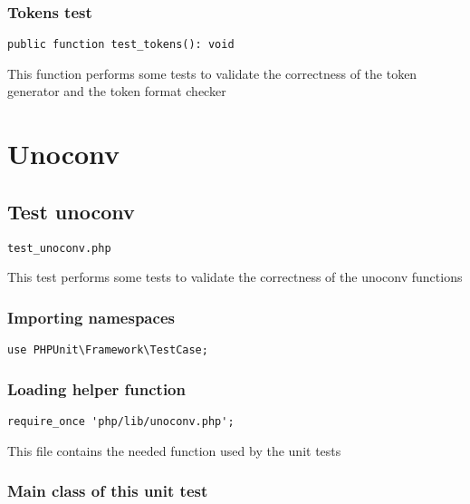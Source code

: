 \documentclass[a4paper]{article}
\begin{document}
\hypertarget{toc393}{}
\subsubsection{Tokens test}

\begin{lstlisting}
public function test_tokens(): void
\end{lstlisting}

This function performs some tests to validate the correctness
of the token generator and the token format checker


\hypertarget{toc394}{}
\section{Unoconv}

\hypertarget{toc395}{}
\subsection{Test unoconv}

\begin{lstlisting}
test_unoconv.php
\end{lstlisting}

This test performs some tests to validate the correctness
of the unoconv functions

\hypertarget{toc396}{}
\subsubsection{Importing namespaces}

\begin{lstlisting}
use PHPUnit\Framework\TestCase;
\end{lstlisting}

\hypertarget{toc397}{}
\subsubsection{Loading helper function}

\begin{lstlisting}
require_once 'php/lib/unoconv.php';
\end{lstlisting}

This file contains the needed function used by the unit tests

\hypertarget{toc398}{}
\subsubsection{Main class of this unit test}
\end{document}
